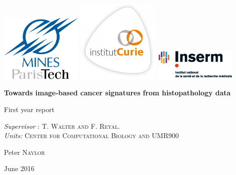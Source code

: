 \documentclass{article}
\begin{document}
\begin{titlepage}

  
\begin{center}
\includegraphics[width=0.3\textwidth]{Mines_ParisTech.png} 
\includegraphics[width=0.3\textwidth]{CURIE.jpg}
\includegraphics[width=0.3\textwidth]{INSERM.jpg}
\end{center}

 
\noindent
\hrulefill
  \begin{center} \bfseries\Huge
Towards image-based cancer signatures from histopathology data
  \end{center}
  \begin{center} \huge
   First year report
  \end{center}
\hrulefill 
  
   \begin{center}  \large
\textit{Supervisor} : \textsc{T. Walter and F. Reyal}. \\
\textit{Units:} \textsc{Center for Computational Biology and UMR900}

   \end{center}
     
  \begin{center} \Large
  Peter \textsc{Naylor}
  \end{center}


  \begin{center}  \large
    June 2016
  \end{center}

\end{titlepage}
\end{document}
